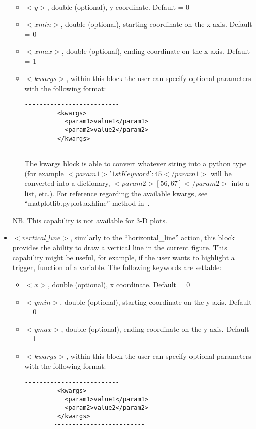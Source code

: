 \begin{itemize}
    \begin{itemize}
        \item \textit{$<y>$}, double (optional), y coordinate. Default = 0
        \item \textit{$<xmin>$}, double (optional), starting coordinate on the x axis. Default = 0
        \item \textit{$<xmax>$}, double (optional), ending coordinate on the x axis. Default = 1
        \item \textit{$<kwargs>$},  within this block the user can specify optional parameters with the following format:
        \begin{lstlisting}[style=XML]
        --------------------------
         <kwargs>
           <param1>value1</param1>
           <param2>value2</param2>
         </kwargs>
        -------------------------
       \end{lstlisting}
         The kwargs block is able to convert whatever string into a python type (for example $<param1>{'1stKeyword':45}</param1>$ will be converted into a dictionary, $<param2>[56,67]</param2>$ into a list, etc.). For reference regarding the available kwargs, see ``matplotlib.pyplot.axhline'' method in~\cite{MatPlotLib}.
      \end{itemize}
 NB. This capability is not available  for 3-D plots.
\item $<vertical\_line>$, similarly to the ``horizontal\_line'' action,  this block  provides the ability to draw a vertical line in the current figure. This capability might be useful, for example, if the user wants to highlight a trigger, function of a variable. The following keywords are settable:
    \begin{itemize}
        \item \textit{$<x>$}, double (optional), x coordinate. Default = 0
        \item \textit{$<ymin>$}, double (optional), starting coordinate on the y axis. Default = 0
        \item \textit{$<ymax>$}, double (optional), ending coordinate on the y axis. Default = 1
        \item \textit{$<kwargs>$},  within this block the user can specify optional parameters with the following format:
        \begin{lstlisting}[style=XML]
        --------------------------
         <kwargs>
           <param1>value1</param1>
           <param2>value2</param2>
         </kwargs>
        -------------------------
       \end{lstlisting}

\end{itemize}
\end{itemize}
